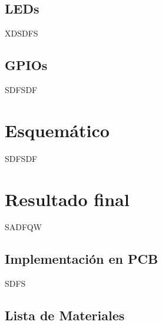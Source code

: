\subsection{LEDs}
\label{diseno:sec:leds}

XDSDFS

\subsection{GPIOs}
\label{diseno:sec:gpio}

SDFSDF

\section{Esquemático}
\label{diseno:sec:esquematico}

SDFSDF

\section{Resultado final}
\label{diseno:sec:herramientas}

SADFQW 


\subsection{Implementación en PCB}

SDFS 


\subsection{Lista de Materiales}


